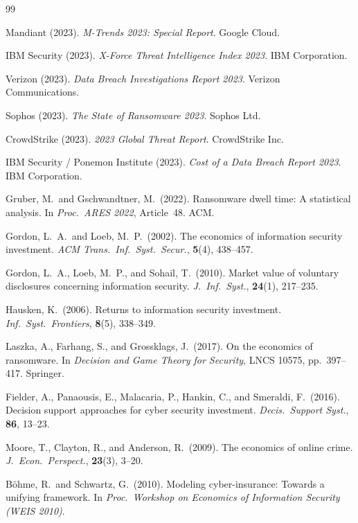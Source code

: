 \documentclass[12pt,a4paper]{article}
\theoremstyle{plain}
\theoremstyle{definition}
\theoremstyle{remark}
\begin{document}
\begin{thebibliography}{99}

Mandiant (2023).
\textit{M-Trends 2023: Special Report}.
Google Cloud.

IBM Security (2023).
\textit{X-Force Threat Intelligence Index 2023}.
IBM Corporation.

Verizon (2023).
\textit{Data Breach Investigations Report 2023}.
Verizon Communications.

Sophos (2023).
\textit{The State of Ransomware 2023}.
Sophos Ltd.

CrowdStrike (2023).
\textit{2023 Global Threat Report}.
CrowdStrike Inc.

IBM Security / Ponemon Institute (2023).
\textit{Cost of a Data Breach Report 2023}.
IBM Corporation.

Gruber, M.\ and Gschwandtner, M.\ (2022).
Ransomware dwell time: A statistical analysis.
In \textit{Proc.\ ARES 2022}, Article~48.
ACM.

Gordon, L.\ A.\ and Loeb, M.\ P.\ (2002).
The economics of information security investment.
\textit{ACM Trans.\ Inf.\ Syst.\ Secur.}, \textbf{5}(4), 438--457.

Gordon, L.\ A., Loeb, M.\ P., and Sohail, T.\ (2010).
Market value of voluntary disclosures concerning information security.
\textit{J.\ Inf.\ Syst.}, \textbf{24}(1), 217--235.

Hausken, K.\ (2006).
Returns to information security investment.
\textit{Inf.\ Syst.\ Frontiers}, \textbf{8}(5), 338--349.

Laszka, A., Farhang, S., and Grossklags, J.\ (2017).
On the economics of ransomware.
In \textit{Decision and Game Theory for Security},
LNCS 10575, pp.~397--417.
Springer.

Fielder, A., Panaousis, E., Malacaria, P., Hankin, C., and Smeraldi, F.\ (2016).
Decision support approaches for cyber security investment.
\textit{Decis.\ Support Syst.}, \textbf{86}, 13--23.

Moore, T., Clayton, R., and Anderson, R.\ (2009).
The economics of online crime.
\textit{J.\ Econ.\ Perspect.}, \textbf{23}(3), 3--20.

B{\"o}hme, R.\ and Schwartz, G.\ (2010).
Modeling cyber-insurance: Towards a unifying framework.
In \textit{Proc.\ Workshop on Economics of Information Security (WEIS 2010)}.


\end{thebibliography}
\end{document}
